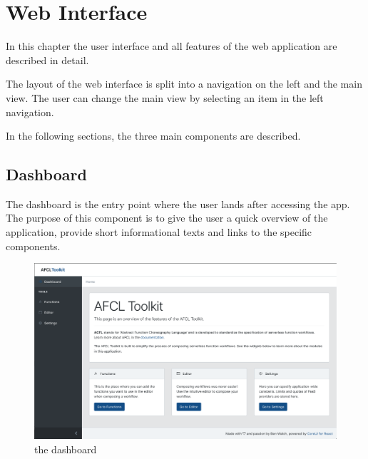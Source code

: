 \documentclass[a4paper,top=25mm,bottom=25mm,12pt,pdftex,halfparskip,twoside,bibtotoc,numbers=noenddot]{scrbook}
\begin{document}

\chapter{Web Interface}
\label{chap:impl-webinterface}


In this chapter the user interface and all features of the web application are described in detail.

The layout of the web interface is split into a navigation on the left and the main view. The user can change the main view by selecting an item in the left navigation.

In the following sections, the three main components are described.

\section{Dashboard}

The dashboard is the entry point where the user lands after accessing the app. The purpose of this component is to give the user a quick overview of the application, provide short informational texts and links to the specific components. 

\begin{figure}[H]
  \centering
  \includegraphics[width=\textwidth]{dashboard}
  \caption{the dashboard}
\end{figure}
\end{document}
